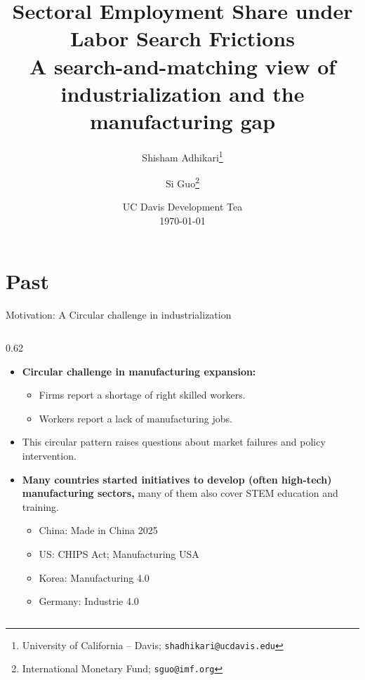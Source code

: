 \documentclass[9pt,xcolor={svgnames}]{beamer}
\title[Bridging the Manufacturing Gap]{\large \textbf{Sectoral Employment Share under Labor Search Frictions\\ \normalsize A search-and-matching view of industrialization and the manufacturing gap}}
\author{Shisham Adhikari\thanks{University of California – Davis; \texttt{shadhikari@ucdavis.edu}} \and Si Guo\thanks{International Monetary Fund; \texttt{sguo@imf.org}}}
\date[Davis]{%
  UC Davis Development Tea\\[0.5em]
  \today
}
\begin{document}
\begin{frame}
\titlepage %
\end{frame}



\section{Past} 
\begin{frame}{Motivation: A Circular challenge in industrialization}

\setlength{\columnsep}{8pt}

\begin{columns}[T,onlytextwidth]
\begin{column}{0.62\textwidth}
 \begin{itemize}
    \item \textbf{Circular challenge in manufacturing expansion:} 
    \begin{itemize}
        \item Firms report a shortage of right skilled workers.
        \item Workers report a lack of manufacturing jobs.
    \end{itemize}
    
    \vspace{4mm}

    \item This circular pattern raises questions about market failures and policy intervention. 
    
    \vspace{4mm}
    
    \item \textbf{Many countries started initiatives to develop (often high-tech) manufacturing sectors,} 
    many of them also cover STEM education and training.
    \begin{itemize}
        \item China: Made in China 2025
        \item US: CHIPS Act; Manufacturing USA
        \item Korea: Manufacturing 4.0 
        \item Germany: Industrie 4.0
    \end{itemize}
  \end{itemize}
\end{column}


\end{columns}
\end{frame}
\end{document}
